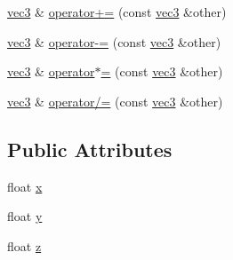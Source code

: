 \begin{DoxyCompactItemize}
\item 
\hyperlink{structu__engine_1_1maths_1_1vec3}{vec3} \& \hyperlink{structu__engine_1_1maths_1_1vec3_a64fdbd5c88b72189c3414423358f85bc}{operator+=} (const \hyperlink{structu__engine_1_1maths_1_1vec3}{vec3} \&other)
\item 
\hyperlink{structu__engine_1_1maths_1_1vec3}{vec3} \& \hyperlink{structu__engine_1_1maths_1_1vec3_adb2b74a6dd4bab89fe303f246f4f51d2}{operator-\/=} (const \hyperlink{structu__engine_1_1maths_1_1vec3}{vec3} \&other)
\item 
\hyperlink{structu__engine_1_1maths_1_1vec3}{vec3} \& \hyperlink{structu__engine_1_1maths_1_1vec3_afc16e0958388dbaecc246b32101b9457}{operator$\ast$=} (const \hyperlink{structu__engine_1_1maths_1_1vec3}{vec3} \&other)
\item 
\hyperlink{structu__engine_1_1maths_1_1vec3}{vec3} \& \hyperlink{structu__engine_1_1maths_1_1vec3_afec777e42c743407943198dcc9b5702a}{operator/=} (const \hyperlink{structu__engine_1_1maths_1_1vec3}{vec3} \&other)
\end{DoxyCompactItemize}
\subsection*{Public Attributes}
\begin{DoxyCompactItemize}
\item 
float \hyperlink{structu__engine_1_1maths_1_1vec3_a3f06fa22fb72fb083d0e641660c39872}{x}
\item 
float \hyperlink{structu__engine_1_1maths_1_1vec3_a81eeaa47644dce42e0da6e6a76c25a79}{y}
\item 
float \hyperlink{structu__engine_1_1maths_1_1vec3_ad154179faa92b8c3e78c2256a41096ee}{z}
\end{DoxyCompactItemize}
